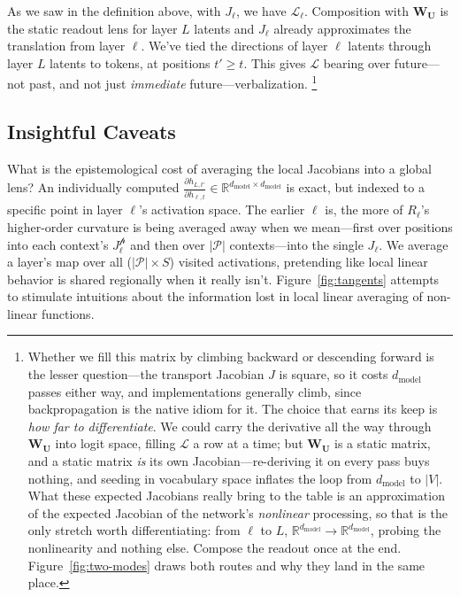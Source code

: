 \documentclass{article}
\newcommand{\jlens}{\mathscr{L}}
\newcommand{\dmodel}{d_{\text{model}}}
\begin{document}
As we saw in the definition above, with \(J_\ell\), we have \(\jlens_\ell\). Composition with \(\mathbf{W_U}\) is the static readout lens for layer \(L\) latents and \(J_\ell\) already approximates the translation from layer \(\ell\). We've tied the directions of layer \(\ell\) latents through layer \(L\) latents to tokens, at positions \(t' \ge t\). This gives \(\jlens\) bearing over future---not past, and not just \textit{immediate} future---verbalization. \footnote{Whether we fill this matrix by climbing backward or descending forward is the lesser question---the transport Jacobian \(J\) is square, so it costs \(\dmodel\) passes either way, and implementations generally climb, since backpropagation is the native idiom for it. The choice that earns its keep is \textit{how far to differentiate}. We could carry the derivative all the way through \(\mathbf{W_U}\) into logit space, filling \(\jlens\) a row at a time; but \(\mathbf{W_U}\) is a static matrix, and a static matrix \textit{is} its own Jacobian---re-deriving it on every pass buys nothing, and seeding in vocabulary space inflates the loop from \(\dmodel\) to \(|V|\). What these expected Jacobians really bring to the table is an approximation of the expected Jacobian of the network's \textit{nonlinear} processing, so that is the only stretch worth differentiating: from \(\ell\) to \(L\), \(\mathbb{R}^{\dmodel} \to \mathbb{R}^{\dmodel}\), probing the nonlinearity and nothing else. Compose the readout once at the end. Figure~\ref{fig:two-modes} draws both routes and why they land in the same place.} 




\subsection{Insightful Caveats}
What is the epistemological cost of averaging the local Jacobians into a global lens? An individually computed \(\frac{\partial h_{L,t'}}{\partial h_{\ell,t}} \in \mathbb{R}^{\dmodel \times \dmodel}\) is exact, but indexed to a specific point in layer \(\ell\)'s activation space. The earlier \(\ell\) is, the more of \(R_{\ell}\)'s higher-order curvature is being averaged away when we mean---first over positions into each context's \(J^{\mathscr{p}}_{\ell}\) and then over \(|\mathscr{P}|\) contexts---into the single \(J_{\ell}\). We average a layer's map over all (\(|\mathscr{P}| \times S\)) visited activations, pretending like local linear behavior is shared regionally when it really isn't. Figure~\ref{fig:tangents} attempts to stimulate intuitions about the information lost in local linear averaging of non-linear functions.
\end{document}
